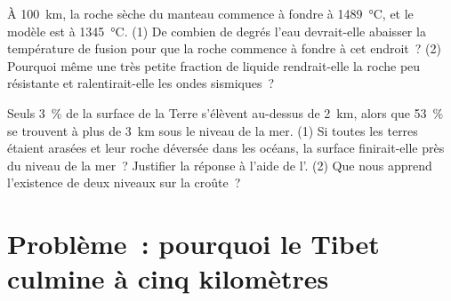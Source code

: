 \begin{exercise}[$\star\star\star$]\label{exo:g11:lithosphere-asthenosphere:14}
À \qty{100}{km}, la roche sèche du manteau commence à fondre à
\qty{1489}{\celsius}, et le  modèle est à \qty{1345}{\celsius}.
(1) De combien de degrés l'eau devrait-elle abaisser la température de
fusion pour que la roche commence à fondre à cet endroit~? (2) Pourquoi même
une très petite fraction de liquide rendrait-elle la roche peu résistante
et ralentirait-elle les ondes sismiques~?
\end{exercise}

\begin{exercise}[$\star\star\star$]\label{exo:g11:lithosphere-asthenosphere:15}
Seuls \qty{3}{\percent} de la surface de la Terre s'élèvent au-dessus de
\qty{2}{km}, alors que \qty{53}{\percent} se trouvent à plus de
\qty{3}{km} sous le niveau de la mer. (1) Si toutes les terres étaient
arasées et leur roche déversée dans les océans, la surface finirait-elle
près du niveau de la mer~? Justifier la réponse à l'aide de l'.
(2) Que nous apprend l'existence de deux niveaux sur la croûte~?
\end{exercise}

\section{Problème~: pourquoi le Tibet culmine à cinq kilomètres}

